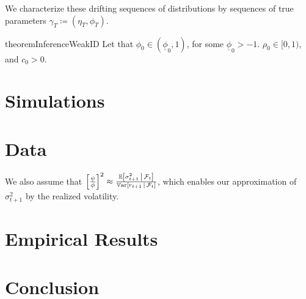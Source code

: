 \documentclass[11pt, letterpaper, twoside, final]{article}
\begin{document}
We characterize these drifting sequences of distributions by sequences of true parameters $\gamma_T \coloneqq
(\eta_T, \phi_T)$.


\begin{restatable}{theorem}{InferenceWeakID}
    Let that $\phi_0  \in (\underline{\phi}_0,1)$, for some $\underline{\phi}_0 > -1$. 
    $\rho_0 \in [0,1)$, and $c_0 > 0$. 

\end{restatable}


\section{Simulations}

\section{Data}\label{sec:data}

We also assume that $\left[ \frac{\psi}{\phi} \right]^2 \approx \frac{\operatorname{\mathbb{E}} \left[\sigma^2_{t+1} \,\middle\vert\,
\mathcal{F}_t\right]}{\operatorname{\mathbb{V}ar}\left[r_{t+1} \,\middle\vert\, \mathcal{F}_t\right]}$, which enables our approximation of $\sigma^2_{t+1}$ by the
realized volatility.

\section{Empirical Results}

\section{Conclusion}

\clearpage

{}
\printbibliography
\clearpage
\end{document}
